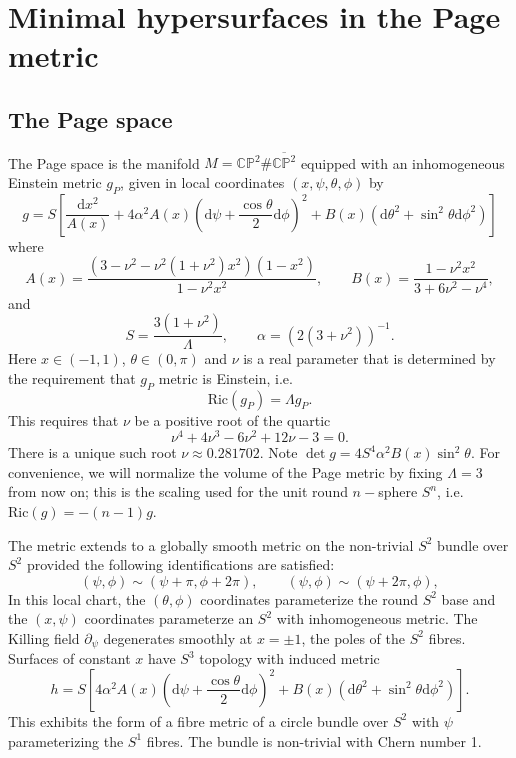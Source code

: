 \documentclass[11pt]{amsart}
\theoremstyle{plain}
\newcommand{\td}{\text{d}}
\theoremstyle{definition}
\numberwithin{equation}{section}
\begin{document}
\section{Minimal hypersurfaces in the Page metric}
\subsection{The Page space}
The Page space \cite{Page} is the manifold $M = \mathbb{CP}^2 \# \overline{\mathbb{CP}^2}$ equipped with an inhomogeneous Einstein metric $g_P$, given in local coordinates $(x,\psi,\theta,\phi)$ by
\begin{equation}
g = S \left[\frac{\td x^2}{A(x)} + 4 \alpha^2 A(x) \left(\td \psi + \frac{\cos\theta}{2} \td \phi \right)^2 + B(x) (\td \theta^2 + \sin^2\theta \td\phi^2) \right]
\end{equation} where 
\begin{equation}
A(x) = \frac{(3 - \nu^2 - \nu^2 (1+ \nu^2)x^2) (1-x^2) } {1 - \nu^2 x^2}, \qquad B(x) =  \frac{1 - \nu^2 x^2}{3 + 6\nu^2 - \nu^4}, \end{equation} and \begin{equation} S = \frac{3(1 + \nu^2)}{\Lambda}, \qquad  \alpha = (2 (3 + \nu^2))^{-1}.
\end{equation} Here  $x \in (-1,1)$, $\theta \in (0,\pi)$ and $\nu$ is a real parameter that is determined by the requirement that $g_P$ metric is Einstein, i.e. 
\begin{equation}
\text{Ric}(g_P) = \Lambda g_P.
\end{equation} This requires that $\nu$ be a positive root of the quartic
\begin{equation}
\nu^4 + 4\nu^3 - 6 \nu^2 + 12 \nu - 3 =0.
\end{equation} There is a unique such root $\nu \approx 0.281702$. Note $\det g = 4 S^4 \alpha^2 B(x) \sin^2\theta$. For convenience, we will normalize the volume of the Page metric by fixing $\Lambda = 3$ from now on; this is the scaling used for the unit round $n-$sphere $S^n$, i.e. $\text{Ric}(g) = -(n-1)g$. 


The metric extends to a globally smooth metric on the non-trivial $S^2$ bundle over $S^2$ provided the following identifications are satisfied: 
\begin{equation}\label{identifications}
(\psi, \phi) \sim (\psi + \pi, \phi + 2\pi), \qquad (\psi, \phi) \sim (\psi + 2\pi, \phi),
\end{equation} In this local chart, the $(\theta, \phi)$ coordinates parameterize the round $S^2$ base and the $(x,\psi)$ coordinates parameterze an $S^2$ with inhomogeneous metric. The Killing field $\partial_\psi$ degenerates smoothly at  $x = \pm 1$, the poles of the $S^2$ fibres. Surfaces of constant $x$ have $S^3$ topology with induced metric 
\begin{equation}
    h = S \left[4 \alpha^2 A(x) \left(\td \psi + \frac{\cos\theta}{2} \td \phi \right)^2 + B(x) (\td \theta^2 + \sin^2\theta \td\phi^2) \right].
\end{equation} This exhibits the form of a fibre metric of a circle bundle over $S^2$ with $\psi$ parameterizing the $S^1$ fibres.  The bundle is non-trivial with Chern number 1.
\end{document}
